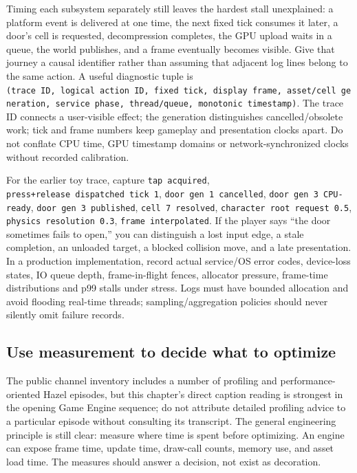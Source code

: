 Timing each subsystem separately still leaves the hardest stall unexplained: a platform event is delivered at one time, the next fixed tick consumes it later, a door's cell is requested, decompression completes, the GPU upload waits in a queue, the world publishes, and a frame eventually becomes visible. Give that journey a causal identifier rather than assuming that adjacent log lines belong to the same action. A useful diagnostic tuple is \texttt{(trace\ ID,\ logical\ action\ ID,\ fixed\ tick,\ display\ frame,\ asset/cell\ generation,\ service\ phase,\ thread/queue,\ monotonic\ timestamp)}. The trace ID connects a user-visible effect; the generation distinguishes cancelled/obsolete work; tick and frame numbers keep gameplay and presentation clocks apart. Do not conflate CPU time, GPU timestamp domains or network-synchronized clocks without recorded calibration.

For the earlier toy trace, capture \texttt{tap\ acquired}, \texttt{press+release\ dispatched\ tick\ 1}, \texttt{door\ gen\ 1\ cancelled}, \texttt{door\ gen\ 3\ CPU-ready}, \texttt{door\ gen\ 3\ published}, \texttt{cell\ 7\ resolved}, \texttt{character\ root\ request\ 0.5}, \texttt{physics\ resolution\ 0.3}, \texttt{frame\ interpolated}. If the player says ``the door sometimes fails to open,'' you can distinguish a lost input edge, a stale completion, an unloaded target, a blocked collision move, and a late presentation. In a production implementation, record actual service/OS error codes, device-loss states, IO queue depth, frame-in-flight fences, allocator pressure, frame-time distributions and p99 stalls under stress. Logs must have bounded allocation and avoid flooding real-time threads; sampling/aggregation policies should never silently omit failure records.

\subsection{Use measurement to decide what to optimize}\label{06-engine-ii-ch041-use-measurement-to-decide-what-to-optimize}

The public channel inventory includes a number of profiling and performance-oriented Hazel episodes, but this chapter's direct caption reading is strongest in the opening Game Engine sequence; do not attribute detailed profiling advice to a particular episode without consulting its transcript. The general engineering principle is still clear: measure where time is spent before optimizing. An engine can expose frame time, update time, draw-call counts, memory use, and asset load time. The measures should answer a decision, not exist as decoration.

